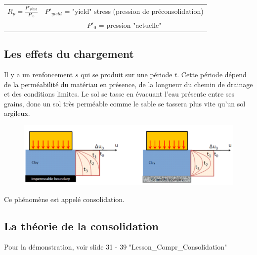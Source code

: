 \medskip

\begin{center}
\begin{tabular}{c|c}
    $R_p = \frac{P'_{yield}}{P'_0}$  &   $P'_{yield}$ = "yield" stress (pression de préconsolidation)  \\
      &  $P'_0$ = pression "actuelle"     
\end{tabular}
\end{center}

\subsection{Les effets du chargement}

Il y a un renfoncement $s$ qui se produit sur une période $t$. Cette période dépend de la perméabilité du matériau en présence, de la longueur du chemin de drainage et des conditions limites. Le sol se tasse en évacuant l'eau présente entre ses grains, donc un sol très perméable comme le sable se tassera plus vite qu'un sol argileux. 

\begin{figure}[h!]
\center
   \includegraphics[scale=1]{Verastegui/images/V2.PNG}
\end{figure}

Ce phénomène est appelé consolidation.

\subsection{La théorie de la consolidation}

Pour la démonstration, voir slide 31 - 39 "Lesson\_Compr\_Consolidation"

